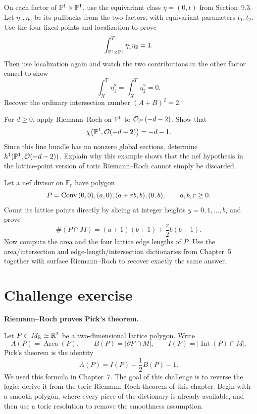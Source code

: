 \begin{exercises}
\item On each factor of \(\mathbb{P}^1\times\mathbb{P}^1\), use the equivariant
class \(\eta=(0,t)\) from Section~9.3.  Let \(\eta_1,\eta_2\) be its
pullbacks from the two factors, with equivariant parameters
\(t_1,t_2\).  Use the four fixed points and localization to prove
\[
\int_{\mathbb{P}^1\times\mathbb{P}^1}^{T}
\eta_1\eta_2=1.
\]
Then use localization again and watch the two contributions in the
other factor cancel to show
\[
\int_X^T\eta_1^2
=
\int_X^T\eta_2^2
=0.
\]
Recover the ordinary intersection number
\((A+B)^2=2\).

\item For \(d\geq0\), apply Riemann--Roch on \(\mathbb{P}^1\) to
\(\mathcal O_{\mathbb{P}^1}(-d-2)\).  Show that
\[
\chi\bigl(\mathbb{P}^1,\mathcal O(-d-2)\bigr)=-d-1.
\]
Since this line bundle has no nonzero global sections, determine
\(h^1(\mathbb{P}^1,\mathcal O(-d-2))\).  Explain why this example shows that
the nef hypothesis in the lattice-point version of toric
Riemann--Roch cannot simply be discarded.

\item Let a nef divisor on \(\mathbb F_r\) have polygon
\[
P=\operatorname{Conv}{(0,0),(a,0),(a+rb,b),(0,b)},
\qquad a,b,r\geq0.
\]
Count its lattice points directly by slicing at integer heights
\(y=0,1,\ldots,b\), and prove
\[
\#(P\cap M)
=
(a+1)(b+1)+\frac r2b(b+1).
\]
Now compute the area and the four lattice edge lengths of \(P\).
Use the area/intersection and edge-length/intersection dictionaries
from Chapter~5 together with surface Riemann--Roch to recover exactly
the same answer.

\end{exercises}

\clearpage
\section*{Challenge exercise}

\noindent
\textbf{Riemann--Roch proves Pick's theorem.}

\medskip

Let \(P\subset M_{\mathbb{R}}\simeq\mathbb{R}^2\) be a two-dimensional lattice
polygon.  Write
\[
A(P)=\operatorname{Area}(P),
\qquad
B(P)=|\partial P\cap M|,
\qquad
I(P)=|\operatorname{Int}(P)\cap M|.
\]
Pick's theorem is the identity
\[
\boxed{
A(P)=I(P)+\frac12B(P)-1.
}
\]
We used this formula in Chapter~7.  The goal of this challenge is to
reverse the logic: derive it from the toric Riemann--Roch theorem of
this chapter.  Begin with a smooth polygon, where every piece of the
dictionary is already available, and then use a toric resolution to
remove the smoothness assumption.


